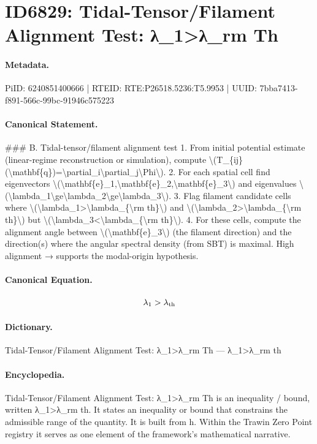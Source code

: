 \section*{ID6829: Tidal-Tensor/Filament Alignment Test: λ\_1>λ\_rm Th}
\paragraph{Metadata.}
PiID: 6240851400666 | RTEID: RTE:P26518.5236:T5.9953 | UUID: 7bba7413-f891-566c-99bc-91946c575223

\paragraph{Canonical Statement.}
\#\#\# B. Tidal-tensor/filament alignment test 1. From initial potential estimate (linear-regime reconstruction or simulation), compute \textbackslash{}(T\_\{ij\}(\textbackslash{}mathbf\{q\})=\textbackslash{}partial\_i\textbackslash{}partial\_j\textbackslash{}Phi\textbackslash{}). 2. For each spatial cell find eigenvectors \textbackslash{}(\textbackslash{}mathbf\{e\}\_1,\textbackslash{}mathbf\{e\}\_2,\textbackslash{}mathbf\{e\}\_3\textbackslash{}) and eigenvalues \textbackslash{}(\textbackslash{}lambda\_1\textbackslash{}ge\textbackslash{}lambda\_2\textbackslash{}ge\textbackslash{}lambda\_3\textbackslash{}). 3. Flag filament candidate cells where \textbackslash{}(\textbackslash{}lambda\_1>\textbackslash{}lambda\_\{\textbackslash{}rm th\}\textbackslash{}) and \textbackslash{}(\textbackslash{}lambda\_2>\textbackslash{}lambda\_\{\textbackslash{}rm th\}\textbackslash{}) but \textbackslash{}(\textbackslash{}lambda\_3<\textbackslash{}lambda\_\{\textbackslash{}rm th\}\textbackslash{}). 4. For these cells, compute the alignment angle between \textbackslash{}(\textbackslash{}mathbf\{e\}\_3\textbackslash{}) (the filament direction) and the direction(s) where the angular spectral density (from SBT) is maximal. High alignment → supports the modal-origin hypothesis.

\paragraph{Canonical Equation.}
\[
\lambda_1>\lambda_{\rm th}
\]

\paragraph{Dictionary.}
Tidal-Tensor/Filament Alignment Test: λ\_1>λ\_rm Th — λ\_1>λ\_rm th

\paragraph{Encyclopedia.}
Tidal-Tensor/Filament Alignment Test: λ\_1>λ\_rm Th is an inequality / bound, written λ\_1>λ\_rm th. It states an inequality or bound that constrains the admissible range of the quantity. It is built from h. Within the Trawin Zero Point registry it serves as one element of the framework's mathematical narrative.
